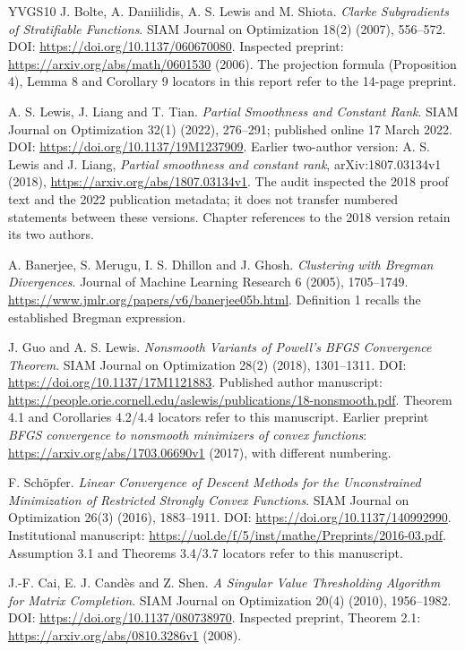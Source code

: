\begin{thebibliography}{YVGS10}
 J. Bolte, A. Daniilidis, A. S. Lewis and M. Shiota. \emph{Clarke Subgradients of Stratifiable Functions}. SIAM Journal on Optimization 18(2) (2007), 556--572. DOI: \url{https://doi.org/10.1137/060670080}. Inspected preprint: \url{https://arxiv.org/abs/math/0601530} (2006). The projection formula (Proposition 4), Lemma 8 and Corollary 9 locators in this report refer to the 14-page preprint.

 A. S. Lewis, J. Liang and T. Tian. \emph{Partial Smoothness and Constant Rank}. SIAM Journal on Optimization 32(1) (2022), 276--291; published online 17 March 2022. DOI: \url{https://doi.org/10.1137/19M1237909}. Earlier two-author version: A. S. Lewis and J. Liang, \emph{Partial smoothness and constant rank}, arXiv:1807.03134v1 (2018), \url{https://arxiv.org/abs/1807.03134v1}. The audit inspected the 2018 proof text and the 2022 publication metadata; it does not transfer numbered statements between these versions. Chapter references to the 2018 version retain its two authors.

 A. Banerjee, S. Merugu, I. S. Dhillon and J. Ghosh. \emph{Clustering with Bregman Divergences}. Journal of Machine Learning Research 6 (2005), 1705--1749. \url{https://www.jmlr.org/papers/v6/banerjee05b.html}. Definition 1 recalls the established Bregman expression.

 J. Guo and A. S. Lewis. \emph{Nonsmooth Variants of Powell's BFGS Convergence Theorem}. SIAM Journal on Optimization 28(2) (2018), 1301--1311. DOI: \url{https://doi.org/10.1137/17M1121883}. Published author manuscript: \url{https://people.orie.cornell.edu/aslewis/publications/18-nonsmooth.pdf}. Theorem 4.1 and Corollaries 4.2/4.4 locators refer to this manuscript. Earlier preprint \emph{BFGS convergence to nonsmooth minimizers of convex functions}: \url{https://arxiv.org/abs/1703.06690v1} (2017), with different numbering.

 F. Sch\"opfer. \emph{Linear Convergence of Descent Methods for the Unconstrained Minimization of Restricted Strongly Convex Functions}. SIAM Journal on Optimization 26(3) (2016), 1883--1911. DOI: \url{https://doi.org/10.1137/140992990}. Institutional manuscript: \url{https://uol.de/f/5/inst/mathe/Preprints/2016-03.pdf}. Assumption 3.1 and Theorems 3.4/3.7 locators refer to this manuscript.

 J.-F. Cai, E. J. Cand\`es and Z. Shen. \emph{A Singular Value Thresholding Algorithm for Matrix Completion}. SIAM Journal on Optimization 20(4) (2010), 1956--1982. DOI: \url{https://doi.org/10.1137/080738970}. Inspected preprint, Theorem 2.1: \url{https://arxiv.org/abs/0810.3286v1} (2008).


\end{thebibliography}
